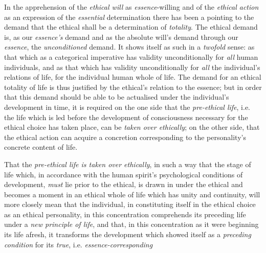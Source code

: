 \documentclass[12pt,a4paper]{book}
\begin{document}
In the apprehension of the \emph{ethical will} as \emph{essence}-willing and of
the \emph{ethical action} as an expression of the \emph{essential} determination
there has been a pointing to the demand that the ethical shall be a
determination of \emph{totality}. The ethical demand is, as our \emph{essence's}
demand and as the absolute will's demand through our \emph{essence}, the
\emph{unconditioned} demand. It shows itself as such in a \emph{twofold} sense:
as that which as a categorical imperative has validity unconditionally for
\emph{all} human individuals, and as that which has validity unconditionally for
\emph{all} the individual's relations of life, for the individual human whole of
life. The demand for an ethical totality of life is thus justified by the
ethical's relation to the essence; but in order that this demand should be able
to be actualised under the individual's development in time, it is required on
the one side that the \emph{pre-ethical life}, i.e. the life which is led before
the development of consciousness necessary for the ethical choice has taken
place, can be \emph{taken over ethically}; on the other side, that the ethical
action can acquire a concretion corresponding to the personality's concrete
content of life.

That the \emph{pre-ethical life is taken over ethically}, in such a way that the
stage of life which, in accordance with the human spirit's psychological
conditions of development, \emph{must} lie prior to the ethical, is drawn in
under the ethical and becomes a moment in an ethical whole of life which has
unity and continuity, will more closely mean that the individual, in
constituting itself in the ethical choice as an ethical personality, in this
concentration comprehends its preceding life under a \emph{new principle of
life}, and that, in this concentration as it were beginning its life afresh, it
transforms the development which showed itself as a \emph{preceding condition}
for its \emph{true}, i.e. \emph{essence-corresponding}
\end{document}
